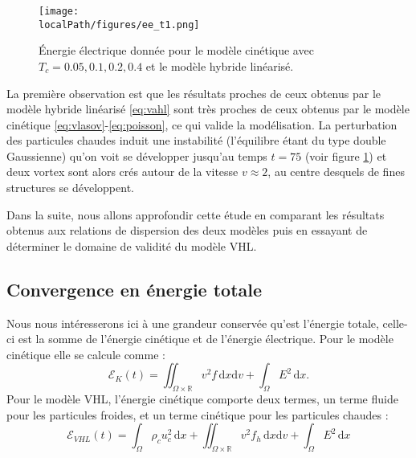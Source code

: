 \begin{figure}[h]
  \centering
  \texttt{[image: \\localPath/figures/ee\_t1.png]}
  \caption{Énergie électrique donnée pour le modèle cinétique avec $T_c=0.05,0.1,0.2,0.4$ et le modèle hybride linéarisé.}
  \label{fig:limit_ee_Tf300}
\end{figure}
La première observation est que les résultats proches de ceux obtenus par le modèle hybride linéarisé \eqref{eq:vahl} sont très proches de ceux obtenus par le modèle cinétique \eqref{eq:vlasov}-\eqref{eq:poisson}, ce qui valide la modélisation. La perturbation des particules chaudes induit une instabilité (l'équilibre étant du type double Gaussienne) qu'on voit se développer jusqu'au temps $t=75$ (voir figure \ref{fig:limit_ee_Tf300}) et deux vortex sont alors crés autour de la vitesse $v\approx 2$, au centre desquels de fines structures se développent. 

Dans la suite, nous allons approfondir cette étude en comparant les résultats obtenus aux relations de dispersion des deux modèles puis en essayant de déterminer le domaine de validité du modèle VHL.  


\FloatBarrier
\subsection{Convergence en énergie totale}

Nous nous intéresserons ici à une grandeur conservée qu'est l'énergie totale, celle-ci est la somme de l'énergie cinétique et de l'énergie électrique. Pour le modèle cinétique elle se calcule comme :
$$
  \mathcal{E}_K(t) = \iint_{\Omega\times\mathbb{R}} v^2 f\,\mathrm{d}x\mathrm{d}v + \int_{\Omega} E^2\,\mathrm{d}x. 
$$
Pour le modèle VHL, l'énergie cinétique comporte deux termes, un terme fluide pour les particules froides, et un terme cinétique pour les particules chaudes :
$$
  \mathcal{E}_{VHL}(t) = \int_\Omega \rho_c u_c^2\,\mathrm{d}x + \iint_{\Omega\times\mathbb{R}}v^2f_h\,\mathrm{d}x\mathrm{d}v + \int_\Omega E^2\,\mathrm{d}x
$$

